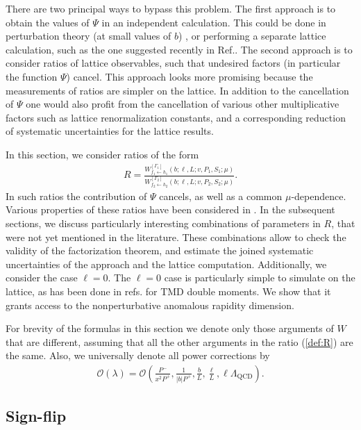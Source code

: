 \documentclass[a4paper, amsfonts, amssymb, amsmath, reprint, showkeys, nofootinbib, twoside]{revtex4-1}
\newcommand{\ot}{\leftarrow}
\renewcommand{\(}{\left(}
\renewcommand{\)}{\right)}
\renewcommand{\[}{\left[}
\renewcommand{\]}{\right]}
\begin{document}
There are two principal ways to bypass this problem. The first approach is to obtain the values of $\Psi$ in an independent calculation. This could be done in perturbation theory (at small values of $b$) \cite{Ebert:2019okf}, or performing a separate lattice calculation, such as the one suggested recently in Ref.\cite{Ji:2019sxk}. The second approach is to consider ratios of lattice observables, such that undesired factors (in particular the function $\Psi$) cancel. This approach looks more promising because the measurements of ratios are simpler on the lattice. In addition to the cancellation of $\Psi$ one would also profit from the cancellation of various other multiplicative factors such as lattice renormalization constants, and a corresponding reduction of systematic uncertainties for the lattice results.

In this section, we consider ratios of the form
\begin{eqnarray}\label{def:R}
R=\frac{W^{[\Gamma_1]}_{f_1\ot h_1}(b;\ell,L;v,P_1,S_1;\mu)}{W^{[\Gamma_2]}_{f_2\ot h_2}(b;\ell,L;v,P_2,S_2;\mu)}.
\end{eqnarray}
In such ratios the contribution of $\Psi$ cancels, as well as a common $\mu$-dependence. Various properties of these ratios have been considered in \cite{Musch:2010ka,Musch:2011er,Engelhardt:2015xja,Ebert:2018gzl,Ebert:2019tvc}. In the subsequent sections, we discuss particularly interesting combinations of parameters in $R$, that were not yet mentioned in the literature. These combinations allow to check the validity of the factorization theorem, and estimate the joined systematic uncertainties of the approach and the lattice computation. Additionally, we consider the case $\ell=0$. The $\ell=0$ case is particularly simple to simulate on the lattice, as has been done in refs.\cite{Musch:2011er,Engelhardt:2015xja} for TMD double moments. We show that it grants access to the nonperturbative anomalous rapidity dimension.

For brevity of the formulas in this section we denote only those arguments of $W$ that are different, assuming that all the other arguments in the ratio (\ref{def:R}) are the same. Also, we universally denote all power corrections by
\begin{eqnarray}
\mathcal{O}(\lambda)=\mathcal{O}\(\frac{P^-}{x^2P^+},\frac{1}{|b|P^+},\frac{b}{L},\frac{\ell}{L},\ell\Lambda_{\text{QCD}}\).
\end{eqnarray}

\subsection{Sign-flip}
\end{document}
